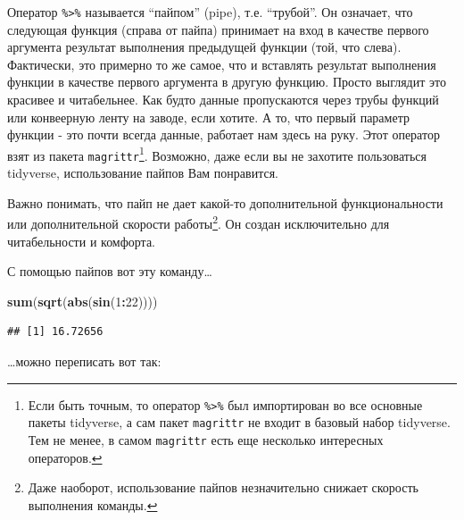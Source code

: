 \documentclass[
]{book}
\newenvironment{Shaded}{\begin{snugshade}}{\end{snugshade}}
\newcommand{\DecValTok}[1]{\textcolor[rgb]{0.00,0.00,0.81}{#1}}
\newcommand{\KeywordTok}[1]{\textcolor[rgb]{0.13,0.29,0.53}{\textbf{#1}}}
\newcommand{\NormalTok}[1]{#1}
\newcommand{\OperatorTok}[1]{\textcolor[rgb]{0.81,0.36,0.00}{\textbf{#1}}}
\newcommand{\StringTok}[1]{\textcolor[rgb]{0.31,0.60,0.02}{#1}}
\begin{document}
Оператор \texttt{\%\textgreater{}\%} называется ``пайпом'' (pipe), т.е. ``трубой''. Он означает, что следующая функция (справа от пайпа) принимает на вход в качестве первого аргумента результат выполнения предыдущей функции (той, что слева). Фактически, это примерно то же самое, что и вставлять результат выполнения функции в качестве первого аргумента в другую функцию. Просто выглядит это красивее и читабельнее. Как будто данные пропускаются через трубы функций или конвеерную ленту на заводе, если хотите. А то, что первый параметр функции - это почти всегда данные, работает нам здесь на руку. Этот оператор взят из пакета \texttt{magrittr}\footnote{Если быть точным, то оператор \texttt{\%\textgreater{}\%} был импортирован во все основные пакеты tidyverse, а сам пакет \texttt{magrittr} не входит в базовый набор tidyverse. Тем не менее, в самом \texttt{magrittr} есть еще несколько интересных операторов.}. Возможно, даже если вы не захотите пользоваться tidyverse, использование пайпов Вам понравится.

Важно понимать, что пайп не дает какой-то дополнительной функциональности или дополнительной скорости работы\footnote{Даже наоборот, использование пайпов незначительно снижает скорость выполнения команды.}. Он создан исключительно для читабельности и комфорта.

С помощью пайпов вот эту команду\ldots{}

\begin{Shaded}
\begin{Highlighting}[]
\KeywordTok{sum}\NormalTok{(}\KeywordTok{sqrt}\NormalTok{(}\KeywordTok{abs}\NormalTok{(}\KeywordTok{sin}\NormalTok{(}\DecValTok{1}\OperatorTok{:}\DecValTok{22}\NormalTok{))))}
\end{Highlighting}
\end{Shaded}

\begin{verbatim}
## [1] 16.72656
\end{verbatim}

\ldots можно переписать вот так:

\begin{Shaded}
\end{Shaded}
\end{document}
